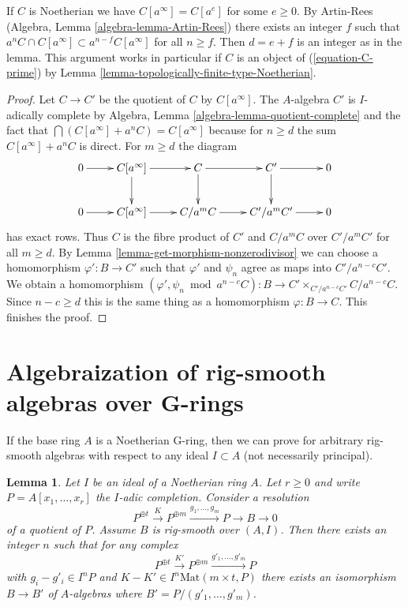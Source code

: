 \documentclass{stacks-project}
\theoremstyle{plain}
\newtheorem{lemma}[subsection]{Lemma}
\theoremstyle{definition}
\theoremstyle{remark}
\numberwithin{equation}{subsection}
\begin{document}
\noindent
If $C$ is Noetherian we have $C[a^\infty] = C[a^e]$ for some
$e \geq 0$. By Artin-Rees (Algebra, Lemma \ref{algebra-lemma-Artin-Rees})
there exists an integer $f$ such that
$a^nC \cap C[a^\infty] \subset a^{n - f}C[a^\infty]$ for all $n \geq f$.
Then $d = e + f$ is an integer as in the lemma. This argument
works in particular if $C$ is an object of (\ref{equation-C-prime})
by Lemma \ref{lemma-topologically-finite-type-Noetherian}.

\begin{proof}
Let $C \to C'$ be the quotient of $C$ by $C[a^\infty]$. The $A$-algebra
$C'$ is $I$-adically complete by
Algebra, Lemma \ref{algebra-lemma-quotient-complete}
and the fact that $\bigcap (C[a^\infty] + a^nC) = C[a^\infty]$
because for $n \geq d$ the sum $C[a^\infty] + a^nC$ is direct.
For $m \geq d$ the diagram
$$
\xymatrix{
0 \ar[r] &
C[a^\infty] \ar[r] \ar[d] &
C \ar[r] \ar[d] & C' \ar[r] \ar[d] & 0 \\
0 \ar[r] &
C[a^\infty] \ar[r] &
C/a^m C \ar[r] & C'/a^m C' \ar[r] & 0
}
$$
has exact rows. Thus $C$ is the fibre product of $C'$ and
$C/a^mC$ over $C'/a^mC'$ for all $m \geq d$. By
Lemma \ref{lemma-get-morphism-nonzerodivisor}
we can choose a homomorphism $\varphi' : B \to C'$
such that $\varphi'$ and $\psi_n$ agree as maps into $C'/a^{n - c}C'$.
We obtain a homomorphism $(\varphi', \psi_n \bmod a^{n - c}C) : B \to
C' \times_{C'/a^{n - c}C'} C/a^{n - c}C$.
Since $n - c \geq d$ this is the same thing as a homomorphism
$\varphi : B \to C$. This finishes the proof.
\end{proof}










\section{Algebraization of rig-smooth algebras over G-rings}
\label{section-over-G-ring}

\noindent
If the base ring $A$ is a Noetherian G-ring, then we can
prove \cite[III Theorem 7]{Elkik} for arbitrary rig-smooth
algebras with respect to any ideal $I \subset A$ (not necessarily
principal).

\begin{lemma}
\label{lemma-close-enough}
Let $I$ be an ideal of a Noetherian ring $A$. Let $r \geq 0$
and write $P = A[x_1, \ldots, x_r]$ the $I$-adic completion.
Consider a resolution
$$
P^{\oplus t} \xrightarrow{K} P^{\oplus m}
\xrightarrow{g_1, \ldots, g_m} P \to B \to 0
$$
of a quotient of $P$. Assume $B$ is rig-smooth over $(A, I)$.
Then there exists an integer $n$ such that for any complex
$$
P^{\oplus t} \xrightarrow{K'} P^{\oplus m}
\xrightarrow{g'_1, \ldots, g'_m} P
$$
with $g_i - g'_i \in I^nP$ and $K - K' \in I^n\text{Mat}(m \times t, P)$
there exists an isomorphism $B \to B'$ of $A$-algebras where
$B' = P/(g'_1, \ldots, g'_m)$.
\end{lemma}
\end{document}
